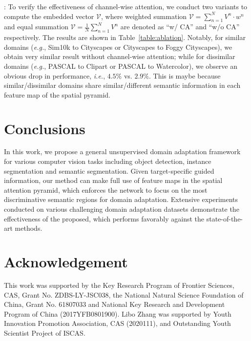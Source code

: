 \documentclass[runningheads]{llncs}
\def\eg{{\em e.g.}}
\def\ie{{\em i.e.}}
\begin{document}
{:}
To verify the effectiveness of channel-wise attention, we conduct two variants to compute the embedded vector $\mathcal{V}$, where weighted summation $\mathcal{V}=\sum_{n=1}^N{V^n \cdot w^n}$ and equal summation $\mathcal{V}=\frac{1}{N}\sum_{n=1}^N{V^n}$ are denoted as ``w/ CA'' and ``w/o CA'' respectively. The results are shown in Table~\ref{table:ablation}. Notably, for similar domains (\eg, Sim10k to Cityscapes or Cityscapes to Foggy Cityscapes), we obtain very similar result without channel-wise attention; while for dissimilar domains (\eg, PASCAL to Clipart or PASCAL to Watercolor), we observe an obvious drop in performance, \ie, $4.5\%$ vs. $2.9\%$. This is maybe because similar/dissimilar domains share similar/different semantic information in each feature map of the spatial pyramid.

\section{Conclusions}
In this work, we propose a general unsupervised domain adaptation framework for various computer vision tasks including object detection, instance segmentation and semantic segmentation. Given target-specific guided information, our method can make full use of feature maps in the spatial attention pyramid, which enforces the network to focus on the most discriminative semantic regions for domain adaptation. Extensive experiments conducted on various challenging domain adaptation datasets demonstrate the effectiveness of the proposed, which performs favorably against the state-of-the-art methods.

\section*{Acknowledgement}
This work was supported by the Key Research Program of Frontier Sciences, CAS, Grant No. ZDBS-LY-JSC038, the National Natural Science Foundation of China, Grant No. 61807033 and National Key Research and Development Program of China (2017YFB0801900). Libo Zhang was supported by Youth Innovation Promotion Association, CAS (2020111), and Outstanding Youth Scientist Project of ISCAS.
\end{document}
